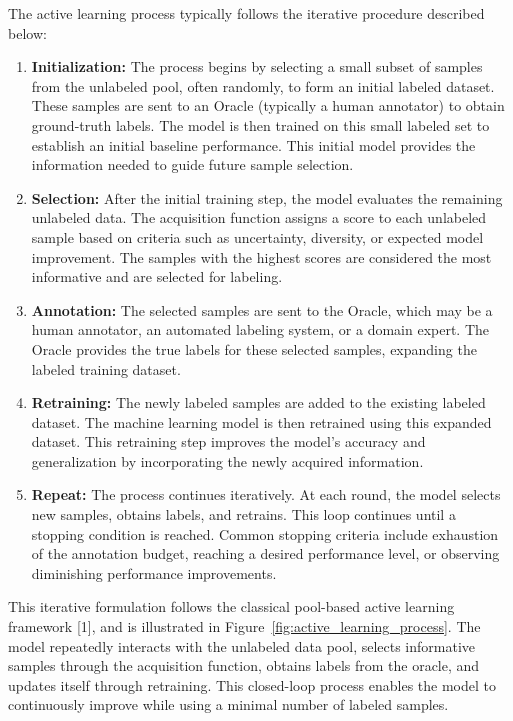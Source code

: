 \documentclass{article}
\renewcommand{\cite}[1]{[#1]}
\begin{document}
The active learning process typically follows the iterative procedure described below:

\begin{enumerate}

\item \textbf{Initialization:} 
The process begins by selecting a small subset of samples from the unlabeled pool, often randomly, to form an initial labeled dataset. These samples are sent to an Oracle (typically a human annotator) to obtain ground-truth labels. The model is then trained on this small labeled set to establish an initial baseline performance. This initial model provides the information needed to guide future sample selection.

\item \textbf{Selection:}
After the initial training step, the model evaluates the remaining unlabeled data. The acquisition function assigns a score to each unlabeled sample based on criteria such as uncertainty, diversity, or expected model improvement. The samples with the highest scores are considered the most informative and are selected for labeling.

\item \textbf{Annotation:} 
The selected samples are sent to the Oracle, which may be a human annotator, an automated labeling system, or a domain expert. The Oracle provides the true labels for these selected samples, expanding the labeled training dataset.

\item \textbf{Retraining:}
The newly labeled samples are added to the existing labeled dataset. The machine learning model is then retrained using this expanded dataset. This retraining step improves the model’s accuracy and generalization by incorporating the newly acquired information.

\item \textbf{Repeat:}
The process continues iteratively. At each round, the model selects new samples, obtains labels, and retrains. This loop continues until a stopping condition is reached. Common stopping criteria include exhaustion of the annotation budget, reaching a desired performance level, or observing diminishing performance improvements.

\end{enumerate}

This iterative formulation follows the classical pool-based active learning framework \cite{1}, and is illustrated in Figure~\ref{fig:active_learning_process}. The model repeatedly interacts with the unlabeled data pool, selects informative samples through the acquisition function, obtains labels from the oracle, and updates itself through retraining. This closed-loop process enables the model to continuously improve while using a minimal number of labeled samples.
\end{document}

